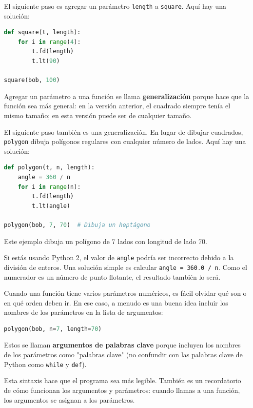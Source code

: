 El siguiente paso es agregar un parámetro \texttt{length} a \texttt{square}. Aquí hay una solución:

\begin{lstlisting}[language=Python]
def square(t, length):
    for i in range(4):
        t.fd(length)
        t.lt(90)

square(bob, 100)
\end{lstlisting}

Agregar un parámetro a una función se llama \textbf{generalización} porque hace que la función sea más general: en la versión anterior, el cuadrado siempre tenía el mismo tamaño; en esta versión puede ser de cualquier tamaño.

El siguiente paso también es una generalización. En lugar de dibujar cuadrados, \texttt{polygon} dibuja polígonos regulares con cualquier número de lados. Aquí hay una solución:

\begin{lstlisting}[language=Python]
def polygon(t, n, length):
    angle = 360 / n
    for i in range(n):
        t.fd(length)
        t.lt(angle)

polygon(bob, 7, 70)  # Dibuja un heptágono
\end{lstlisting}

Este ejemplo dibuja un polígono de 7 lados con longitud de lado 70.

Si estás usando Python 2, el valor de \texttt{angle} podría ser incorrecto debido a la división de enteros. Una solución simple es calcular \texttt{angle = 360.0 / n}. Como el numerador es un número de punto flotante, el resultado también lo será.

Cuando una función tiene varios parámetros numéricos, es fácil olvidar qué son o en qué orden deben ir. En ese caso, a menudo es una buena idea incluir los nombres de los parámetros en la lista de argumentos:

\begin{lstlisting}[language=Python]
polygon(bob, n=7, length=70)
\end{lstlisting}

Estos se llaman \textbf{argumentos de palabras clave} porque incluyen los nombres de los parámetros como "palabras clave" (no confundir con las palabras clave de Python como \texttt{while} y \texttt{def}).

Esta sintaxis hace que el programa sea más legible. También es un recordatorio de cómo funcionan los argumentos y parámetros: cuando llamas a una función, los argumentos se asignan a los parámetros.

